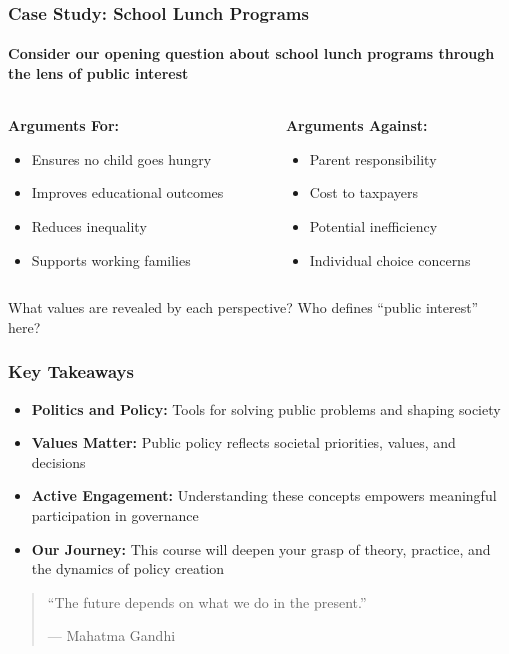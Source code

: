 \documentclass[10pt]{beamer}
\begin{document}
\begin{frame}
\frametitle{Case Study: School Lunch Programs}
\framesubtitle{Consider our opening question about school lunch programs through the lens of public interest}

\begin{block}{}
\begin{columns}
\begin{column}{0.48\textwidth}
\textbf{Arguments For:}
\begin{itemize}
\item Ensures no child goes hungry
\item Improves educational outcomes
\item Reduces inequality
\item Supports working families
\end{itemize}
\end{column}

\begin{column}{0.48\textwidth}
\textbf{Arguments Against:}
\begin{itemize}
\item Parent responsibility
\item Cost to taxpayers
\item Potential inefficiency
\item Individual choice concerns
\end{itemize}
\end{column}
\end{columns}

\vspace{0.5cm}
\centering
What values are revealed by each perspective? Who defines ``public interest'' here?
\end{block}

\end{frame}

\begin{frame}
\frametitle{Key Takeaways}

\begin{itemize}
\item \textbf{Politics and Policy:} Tools for solving public problems and shaping society
\item \textbf{Values Matter:} Public policy reflects societal priorities, values, and decisions
\item \textbf{Active Engagement:} Understanding these concepts empowers meaningful participation in governance
\item \textbf{Our Journey:} This course will deepen your grasp of theory, practice, and the dynamics of policy creation
\end{itemize}

\vspace{1cm}

\begin{quotation}
``The future depends on what we do in the present.''

\vspace{0.3cm}
\hfill --- Mahatma Gandhi
\end{quotation}

\end{frame}
\end{document}
